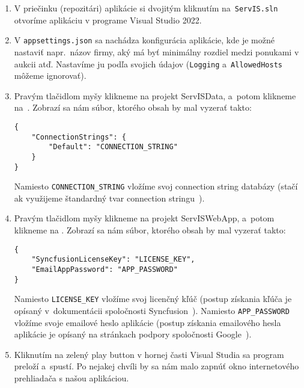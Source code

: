 \begin{enumerate}
  \item V priečinku (repozitári) aplikácie si dvojitým kliknutím na~\verb|ServIS.sln| otvoríme aplikáciu v programe Visual Studio 2022.
  \item V \verb|appsettings.json| sa nachádza konfigurácia aplikácie, kde je možné nastaviť napr.~názov firmy, aký má byť minimálny rozdiel medzi ponukami v aukcii atď. Nastavíme ju podľa svojich údajov (\verb|Logging| a~\verb|AllowedHosts| môžeme ignorovať).
  \item Pravým tlačidlom myšy klikneme na projekt ServISData, a~potom klikneme na~. Zobrazí sa nám súbor, ktorého obsah by mal vyzerať takto:
  
\begin{verbatim}
{
	"ConnectionStrings": {
        "Default": "CONNECTION_STRING"
    }
}
\end{verbatim}  
  
Namiesto \verb|CONNECTION_STRING| vložíme svoj connection string databázy (stačí ak využijeme štandardný tvar connection stringu~\cite{standard connection string}).

  \item Pravým tlačidlom myšy klikneme na projekt ServISWebApp, a~potom klikneme na . Zobrazí sa nám súbor, ktorého obsah by mal vyzerať takto:
  
\begin{verbatim}
{
    "SyncfusionLicenseKey": "LICENSE_KEY",
    "EmailAppPassword": "APP_PASSWORD"
}
\end{verbatim}  
  
Namiesto \verb|LICENSE_KEY| vložíme svoj licenčný kľúč (postup získania kľúča je opísaný v~dokumentácii spoločnosti Syncfusion~\cite{license key}). Namiesto \verb|APP_PASSWORD| vložíme svoje emailové heslo aplikácie (postup získania emailového hesla aplikácie je opísaný na stránkach podpory spoločnosti Google~\cite{app password}).
  
  \item Kliknutím na zelený play button v hornej časti Visual Studia sa program preloží a~spustí. Po nejakej chvíli by sa nám malo zapnúť okno internetového prehliadača s našou aplikáciou.
\end{enumerate}
